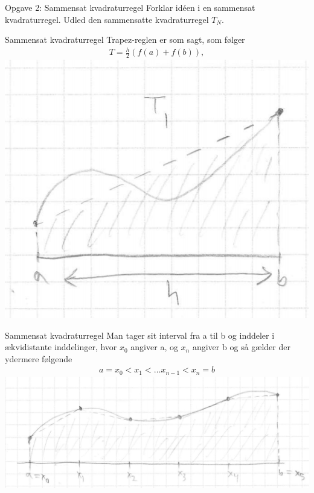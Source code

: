 \begin{frame}{Opgave 2: Sammensat kvadraturregel}
    Forklar idéen i en sammensat kvadraturregel. Udled den sammensatte kvadraturregel
    $T_N$.
\end{frame}

\begin{frame}{Sammensat kvadraturregel}
Trapez-reglen er som sagt, som følger
    \begin{align*}
    T = \frac{h}{2}(f(a)+f(b)),
    \end{align*}
\includegraphics[scale=0.4]{images/TRAPEZZI.png}
\end{frame}

\begin{frame}{Sammensat kvadraturregel}
Man tager sit interval fra a til b og inddeler i ækvidistante inddelinger, hvor $x_0$ angiver a, og $x_n$ angiver b og så gælder der ydermere følgende
    \begin{align*}
    a = x_0 < x_1 < … x_{n-1} < x_n = b
    \end{align*}
\includegraphics[scale=0.3]{images/TRAPEZSAM.png}
\end{frame}

